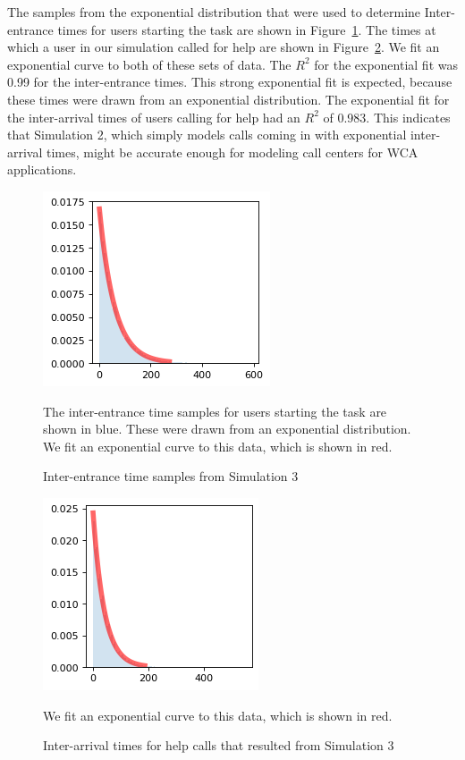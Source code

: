 The samples from the exponential distribution that were used to determine
Inter-entrance times for users starting the task are shown in
Figure~\ref{fig:arrival_times}.
The times at which a user in our simulation called for help are shown in
Figure~\ref{fig:step_patience}.
We fit an exponential curve to both of these sets of data.
The $R^2$ for the exponential fit was 0.99 for the inter-entrance times.
This strong exponential fit is expected, because these times were drawn from an
exponential distribution.
The exponential fit for the inter-arrival times of users calling for help had
an $R^2$ of 0.983.
This indicates that Simulation 2, which simply models calls coming in with
exponential inter-arrival times, might be accurate enough for modeling call
centers for WCA applications.

\begin{figure}[H]
  \includegraphics{figures/montecarlo/arrival_times.png}
  \begin{captiontext}
    The inter-entrance time samples for users starting the task are shown in
    blue.
    These were drawn from an exponential distribution.
    We fit an exponential curve to this data, which is shown in red.
  \end{captiontext}
  \caption{
    Inter-entrance time samples from Simulation 3
  }\label{fig:arrival_times}
\end{figure}

\begin{figure}[H]
  \includegraphics{figures/montecarlo/call_times.png}
  \begin{captiontext}
    We fit an exponential curve to this data, which is shown in red.
  \end{captiontext}
  \caption{
    Inter-arrival times for help calls that resulted from Simulation 3
  }\label{fig:step_patience}
\end{figure}

